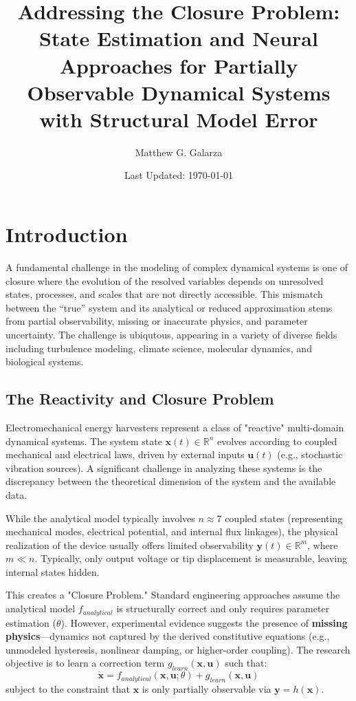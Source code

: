 \documentclass[11pt]{article}
\title{Addressing the Closure Problem: State Estimation and Neural Approaches for Partially Observable Dynamical Systems with Structural Model Error}
\author{Matthew G. Galarza}
\date{Last Updated: \today}
\begin{document}
\maketitle


\section{Introduction}

A fundamental challenge in the modeling of complex dynamical systems is one of closure where the evolution of the resolved variables depends on unresolved states, processes, and scales that are not directly accessible. This mismatch between the “true” system and its analytical or reduced approximation stems from partial observability, missing or inaccurate physics, and parameter uncertainty. The challenge is ubiqutous, appearing in a variety of diverse fields including turbulence modeling, climate science, molecular dynamics, and biological systems.

\subsection{The Reactivity and Closure Problem}
Electromechanical energy harvesters represent a class of "reactive" multi-domain dynamical systems. The system state $\mathbf{x}(t) \in \mathbb{R}^n$ evolves according to coupled mechanical and electrical laws, driven by external inputs $\mathbf{u}(t)$ (e.g., stochastic vibration sources). A significant challenge in analyzing these systems is the discrepancy between the theoretical dimension of the system and the available data. 

While the analytical model typically involves $n \approx 7$ coupled states (representing mechanical modes, electrical potential, and internal flux linkages), the physical realization of the device usually offers limited observability $\mathbf{y}(t) \in \mathbb{R}^m$, where $m \ll n$. Typically, only output voltage or tip displacement is measurable, leaving internal states hidden.

This creates a "Closure Problem." Standard engineering approaches assume the analytical model $f_{analytical}$ is structurally correct and only requires parameter estimation ($\theta$). However, experimental evidence suggests the presence of \textbf{missing physics}—dynamics not captured by the derived constitutive equations (e.g., unmodeled hysteresis, nonlinear damping, or higher-order coupling). The research objective is to learn a correction term $g_{learn}(\mathbf{x}, \mathbf{u})$ such that:
\begin{equation}
    \dot{\mathbf{x}} = f_{analytical}(\mathbf{x}, \mathbf{u}; \theta) + g_{learn}(\mathbf{x}, \mathbf{u})
\end{equation}
subject to the constraint that $\mathbf{x}$ is only partially observable via $\mathbf{y} = h(\mathbf{x})$.
\end{document}
